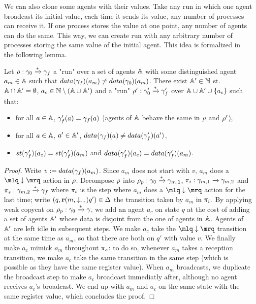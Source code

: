 We can also clone some agents with their values. 
Take any run in which one agent broadcast its initial value, each time it sends its value, any number of processes can receive it. If one process stores the value at one point, any number of agents can do the same. This way, we can create run with any arbitrary number of processes storing the same value of the initial agent. This idea is formalized in the following lemma.

\begin{lemma}\label{lem:strong_copycat}
Let $\rho : \gamma_0 \xrightarrow{*} \gamma_f$ a "run" over a set of agents $\mathbb{A}$ with some distinguished agent $a_m \in \mathbb{A}$ such that $\data{\config_f}(a_m) \ne \data{\config_0}(a_m)$. %
 There exist $\mathbb{A}' \in \mathbb{N}$ st. $\mathbb{A} \cap \mathbb{A}' = \emptyset$, $a_c \in \mathbb{N}\setminus (\mathbb{A} \cup \mathbb{A}')$ and a "run" $\rho': \gamma_0' \xrightarrow{*} \gamma_f'$ over $\mathbb{A} \cup \mathbb{A}' \cup \{a_c\}$ such that:
\begin{itemize}
\item for all $a \in \mathbb{A}$, $\gamma_f'(a) = \gamma_f(a)$ (agents of $\mathbb{A}$ behave the same in $\rho$ and $\rho'$),
\item for all $a \in \mathbb{A}$, $a' \in \mathbb{A}'$, $\data{\config_f}(a) \ne \data{\config_f'}(a')$,
\item $\st{\config_f'}(a_c) = \st{\config_f'}(a_m)$ and $\data{\config_f'}(a_c) = \data{\config_f'}(a_m)$.
\end{itemize}
\end{lemma}

\ifproofs
\begin{proof}
Write $\aval := \data{\config_f}(a_m)$. Since $a_m$ does not start with $v$, $a_m$ does a $\quotemarks{\enregact}$ action in $\rho$.
Decompose $\rho$ into $\rho_p: \gamma_0 \xrightarrow{*} \gamma_{m,1}$, $\pi_i: \gamma_{m,1} \xrightarrow{} \gamma_{m,2}$ and $\pi_s: \gamma_{m,2} \xrightarrow{*} \gamma_f$ where $\pi_i$ is the step where $a_m$ does a $\quotemarks{\enregact}$ action for the last time; write $(q,\textbf{r}(m, \downarrow, ,)q') \in\Delta$ the transition taken by $a_m$ in $\pi_i$. By applying weak copycat on $\rho_p : \gamma_0 \xrightarrow{*} \gamma$, we add an agent $a_c$ on state $q$ at the cost of adding a set of agents $\mathbb{A}'$ whose data is disjoint from  the one of agents in $\mathbb{A}$. Agents of $\mathbb{A}'$ are left idle in subsequent steps. We make $a_c$ take the $\quotemarks{\enregact}$ transition at the same time as $a_m$, so that there are both on $q'$ with value $v$. We finally make $a_c$ mimick $a_m$ throughout $\pi_s$: to do so, whenever $a_m$ takes a reception transition, we make $a_c$ take the same transition in the same step (which is possible as they have the same register value). When $a_m$ broadcasts, we duplicate the broadcast step to make $a_c$ broadcast immediatly after, although no agent receives $a_c$'s broadcast. We end up with $a_m$ and $a_c$ on the same state with the same register value, which concludes the proof. 
 \end{proof}
\fi


